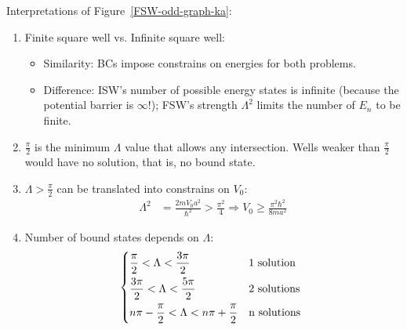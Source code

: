 \documentclass{school-22.101-notes}
\begin{document}
\begin{enumerate}
Interpretations of Figure~\ref{FSW-odd-graph-ka}: 
\begin{enumerate}
    \item Finite square well vs. Infinite square well:
    \begin{itemize}
    \item Similarity: BCs impose constrains on energies for both problems. 
    \item Difference: ISW's number of possible energy states is infinite (because the potential barrier is $\infty$!); FSW's strength $\Lambda^2$ limits the number of $E_n$ to be finite.  
    \end{itemize}
    
    \item {} $\frac{\pi}{2}$ is the minimum $\Lambda$ value that allows any intersection. Wells weaker than $\frac{\pi}{2}$ would have no solution, that is, no bound state. 
     
    \item $\Lambda > \frac{\pi}{2}$  can be translated into constrains on $V_0$:
    \begin{align}
    \Lambda^2 &= \frac{2m V_0 a^2}{\hbar^2} > \frac{\pi^2}{4} \Rightarrow  
    \boxed{V_0 \ge \frac{\pi^2 \hbar^2}{8 m a^2} }
    \end{align}
    
    \item Number of bound states depends on $\Lambda$:
    \begin{align}
        \begin{dcases*}
         \frac{\pi}{2} < \Lambda < \frac{3\pi}{2}   & 1 solution \\
         \frac{3\pi}{2} < \Lambda < \frac{5 \pi}{2} & 2 solutions \\
         n \pi  - \frac{\pi}{2} < \Lambda < n \pi  + \frac{\pi}{2} & n solutions
        \end{dcases*}
    \end{align}
\end{enumerate}



\end{enumerate}
\end{document}
